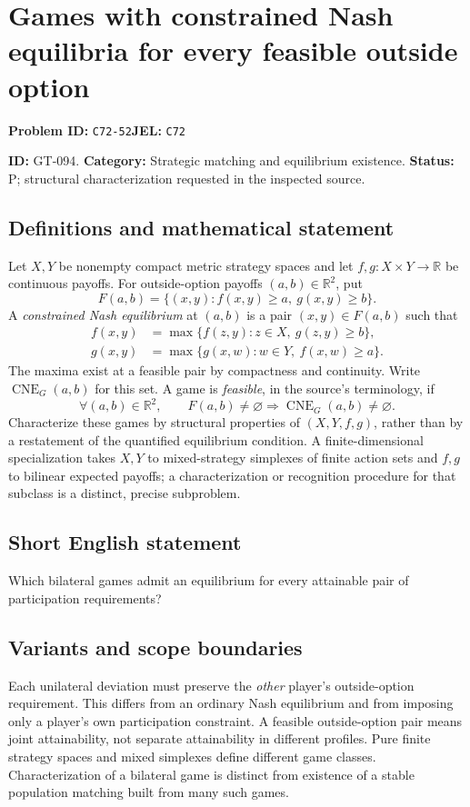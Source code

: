 \documentclass[11pt,a4paper]{article}
\begin{document}
\section*{Games with constrained Nash equilibria for every feasible outside option}
\textbf{Problem ID:} \texttt{C72-52}\quad \textbf{JEL:} \texttt{C72}\par
\label{problem:OP-0224}
\label{game:GT-094}
{\sffamily\small\color{muted}
\noindent\textbf{ID:} GT-094. \textbf{Category:} Strategic matching and equilibrium existence.
\textbf{Status:} P; structural characterization requested in the inspected source.
\par}
\subsection*{Definitions and mathematical statement}
Let $X,Y$ be nonempty compact metric strategy spaces and let
$f,g:X\times Y\to\mathbb R$ be continuous payoffs. For outside-option payoffs $(a,b)\in\mathbb R^2$, put
\[
 F(a,b)=\{(x,y):f(x,y)\geq a,\ g(x,y)\geq b\}.
\]
A \emph{constrained Nash equilibrium} at $(a,b)$ is a pair $(x,y)\in F(a,b)$ such that
\begin{align*}
 f(x,y)&=\max\{f(z,y):z\in X,\ g(z,y)\geq b\},\\
 g(x,y)&=\max\{g(x,w):w\in Y,\ f(x,w)\geq a\}.
\end{align*}
The maxima exist at a feasible pair by compactness and continuity. Write $\operatorname{CNE}_G(a,b)$ for this set. A game is \emph{feasible}, in the source's terminology, if
\[
 \forall(a,b)\in\mathbb R^2,
 \qquad F(a,b)\neq\varnothing\Longrightarrow
                 \operatorname{CNE}_G(a,b)\neq\varnothing.
\]
Characterize these games by structural properties of $(X,Y,f,g)$, rather than by a restatement of the quantified equilibrium condition. A finite-dimensional specialization takes $X,Y$ to mixed-strategy simplexes of finite action sets and $f,g$ to bilinear expected payoffs; a characterization or recognition procedure for that subclass is a distinct, precise subproblem.

\subsection*{Short English statement}
Which bilateral games admit an equilibrium for every attainable pair of participation requirements?

\subsection*{Variants and scope boundaries}
Each unilateral deviation must preserve the \emph{other} player's outside-option requirement. This differs from an ordinary Nash equilibrium and from imposing only a player's own participation constraint. A feasible outside-option pair means joint attainability, not separate attainability in different profiles. Pure finite strategy spaces and mixed simplexes define different game classes. Characterization of a bilateral game is distinct from existence of a stable population matching built from many such games.
\end{document}
